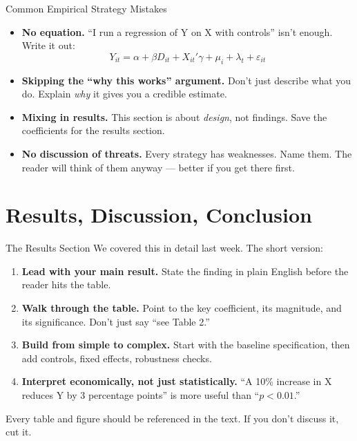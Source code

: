 \begin{frame}{Common Empirical Strategy Mistakes}
  \begin{itemize}
    \item \textbf{No equation.} ``I run a regression of Y on X with controls'' isn't enough. Write it out:
    \[Y_{it} = \alpha + \beta D_{it} + X_{it}'\gamma + \mu_i + \lambda_t + \varepsilon_{it}\]

    \vspace{4pt}

    \item \textbf{Skipping the ``why this works'' argument.} Don't just describe what you do. Explain \emph{why} it gives you a credible estimate.

    \vspace{4pt}

    \item \textbf{Mixing in results.} This section is about \emph{design}, not findings. Save the coefficients for the results section.

    \vspace{4pt}

    \item \textbf{No discussion of threats.} Every strategy has weaknesses. Name them. The reader will think of them anyway --- better if you get there first.
  \end{itemize}
\end{frame}

\section{Results, Discussion, Conclusion}

\begin{frame}{The Results Section}
  We covered this in detail last week. The short version:

  \vspace{6pt}

  \begin{enumerate}
    \item \textbf{Lead with your main result.} State the finding in plain English before the reader hits the table.
    \item \textbf{Walk through the table.} Point to the key coefficient, its magnitude, and its significance. Don't just say ``see Table 2.''
    \item \textbf{Build from simple to complex.} Start with the baseline specification, then add controls, fixed effects, robustness checks.
    \item \textbf{Interpret economically, not just statistically.} ``A 10\% increase in X reduces Y by 3 percentage points'' is more useful than ``$p < 0.01$.''
  \end{enumerate}

  \vspace{6pt}

  Every table and figure should be referenced in the text. If you don't discuss it, cut it.
\end{frame}


